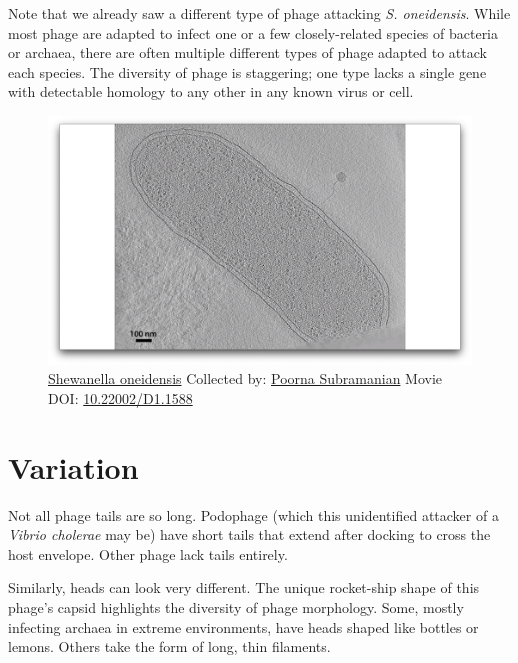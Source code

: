 \documentclass[]{tufte-book}
\begin{document}
Note that we already saw a different type of phage attacking \emph{S.
oneidensis}. While most phage are adapted to infect one or a few
closely-related species of bacteria or archaea, there are often multiple
different types of phage adapted to attack each species. The diversity
of phage is staggering; one type lacks a single gene with detectable
homology to any other in any known virus or cell.





\begin{figure}
\includegraphics{movie_stills/10_3} \caption[\protect\hyperlink{tree}{Shewanella oneidensis} Collected by:
\protect\hyperlink{poorna_subramanian}{Poorna Subramanian} Movie DOI:
\href{https://doi.org/10.22002/D1.1588}{10.22002/D1.1588}]{\protect\hyperlink{tree}{Shewanella oneidensis} Collected by:
\protect\hyperlink{poorna_subramanian}{Poorna Subramanian} Movie DOI:
\href{https://doi.org/10.22002/D1.1588}{10.22002/D1.1588}}\label{fig:10-3}
\end{figure}

\section{Variation}\label{variation}

Not all phage tails are so long. Podophage (which this unidentified
attacker of a \emph{Vibrio cholerae} may be) have short tails that
extend after docking to cross the host envelope. Other phage lack tails
entirely.

Similarly, heads can look very different. The unique rocket-ship shape
of this phage's capsid highlights the diversity of phage morphology.
Some, mostly infecting archaea in extreme environments, have heads
shaped like bottles or lemons. Others take the form of long, thin
filaments.
\end{document}
